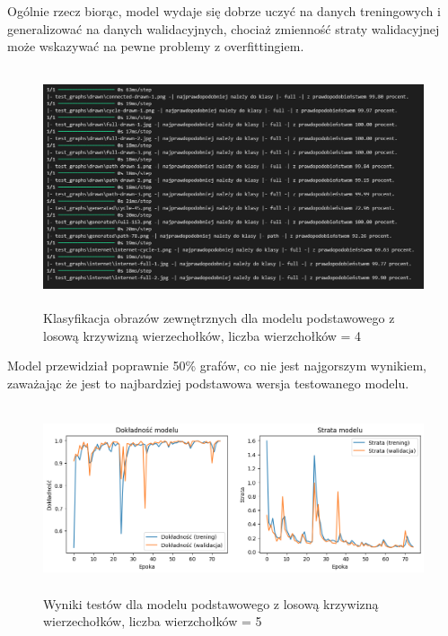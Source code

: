 Ogólnie rzecz biorąc, model wydaje się dobrze uczyć na danych treningowych i generalizować na danych walidacyjnych,
chociaż zmienność straty walidacyjnej może wskazywać na pewne problemy z overfittingiem.

\begin{figure}[ht]
	\centering
	\includegraphics[height=7cm]{resources/tests/images/v3/base4_txt.png}
	\caption{Klasyfikacja obrazów zewnętrznych dla modelu podstawowego z losową krzywizną wierzechołków, liczba wierzchołków = 4}
	\label{Fig:tests-base-2}
\end{figure}
\FloatBarrier

Model przewidział poprawnie 50\% grafów, co nie jest najgorszym wynikiem,
zaważając że jest to najbardziej podstawowa wersja testowanego modelu.

\begin{figure}[ht]
	\centering
	\includegraphics[height=5.5cm]{resources/tests/images/v3/base5_img.png}
	\caption{Wyniki testów dla modelu podstawowego z losową krzywizną wierzechołków, liczba wierzchołków = 5}
	\label{Fig:tests-base-1}
\end{figure}
\FloatBarrier

